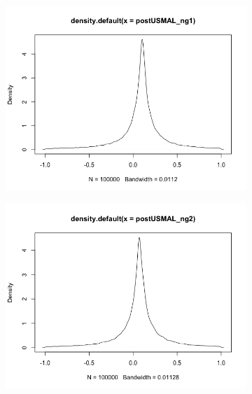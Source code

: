 \documentclass[mstat,12pt]{unswthesis}  %
\numberwithin{equation}{section}
\begin{document}
\begin{figure}[h]
\centering
\begin{subfigure}{.32\textwidth}
  \centering
  \includegraphics[width=\linewidth]{postUSMALng1.png}  
  \label{fig:sub-first}
\end{subfigure}
\begin{subfigure}{.32\textwidth}
  \centering
  \includegraphics[width=\linewidth]{postUSMALng2.png}  
  \label{fig:sub-second}
\end{subfigure}


\end{figure}
\end{document}
